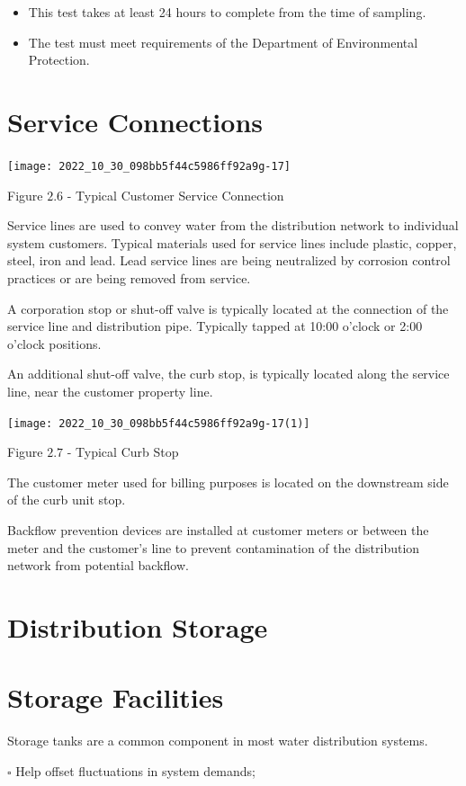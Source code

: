 \documentclass[10pt]{article}
\begin{document}
\begin{itemize}
  \item This test takes at least 24 hours to complete from the time of sampling.

  \item The test must meet requirements of the Department of Environmental Protection.

\end{itemize}
\section{Service Connections}
\texttt{[image: 2022\_10\_30\_098bb5f44c5986ff92a9g-17]}

Figure $2.6$ - Typical Customer Service Connection

Service lines are used to convey water from the distribution network to individual system customers. Typical materials used for service lines include plastic, copper, steel, iron and lead. Lead service lines are being neutralized by corrosion control practices or are being removed from service.

A corporation stop or shut-off valve is typically located at the connection of the service line and distribution pipe. Typically tapped at 10:00 o'clock or 2:00 o'clock positions.

An additional shut-off valve, the curb stop, is typically located along the service line, near the customer property line.

\texttt{[image: 2022\_10\_30\_098bb5f44c5986ff92a9g-17(1)]}

Figure $2.7$ - Typical Curb Stop

The customer meter used for billing purposes is located on the downstream side of the curb unit stop.

Backflow prevention devices are installed at customer meters or between the meter and the customer's line to prevent contamination of the distribution network from potential backflow.

\section{Distribution Storage}
\section{Storage Facilities}
Storage tanks are a common component in most water distribution systems.

$\square$ Help offset fluctuations in system demands;
\end{document}
